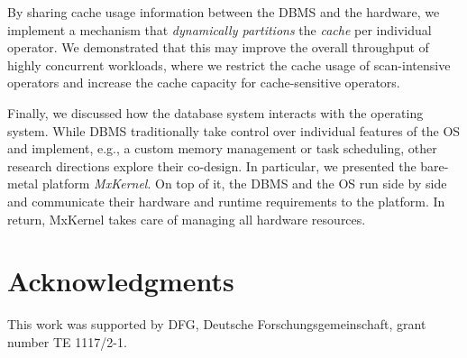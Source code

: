 \documentclass[11pt,dvipdfm]{article}
\begin{document}
By sharing cache usage information between the DBMS and the hardware, we implement a mechanism that \emph{dynamically partitions} the \emph{cache} per individual operator.
We demonstrated that this may improve the overall throughput of highly concurrent workloads, where we restrict the cache usage of scan-intensive operators and increase the cache capacity for cache-sensitive operators.

Finally, we discussed how the database system interacts with the operating system.
While DBMS traditionally take control over individual features of the OS and implement, e.g., a custom memory management or task scheduling, other research directions explore their co-design.
In particular, we presented the bare-metal platform \emph{MxKernel}.
On top of it, the DBMS and the OS run side by side and communicate their hardware and runtime requirements to the platform.
In return, MxKernel takes care of managing all hardware resources.

\section*{Acknowledgments}
This work was supported by DFG, Deutsche Forschungsgemeinschaft, grant number TE 1117/2-1.
\end{document}
